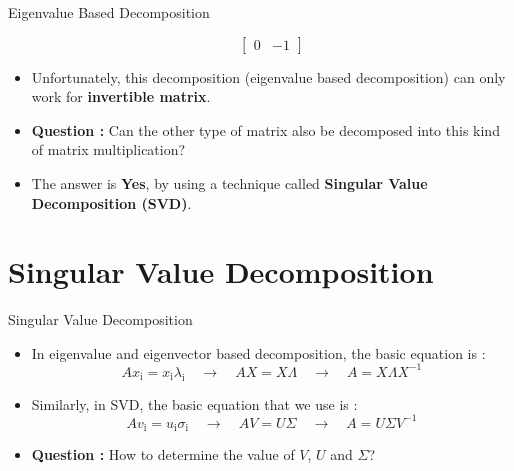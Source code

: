 \begin{frame}[t]{Eigenvalue Based Decomposition}
\begin{itemize}
\begin{equation*}
			\begin{bmatrix}
				0 & -1
			\end{bmatrix}
		\end{equation*}
		\item Unfortunately, this decomposition (eigenvalue based decomposition) can only work for \textbf{invertible matrix}.
		\item \textbf{Question :} Can the other type of matrix also be decomposed into this kind of matrix multiplication?
		\item The answer is \textbf{Yes}, by using a technique called \textbf{Singular Value Decomposition (SVD)}.
	\end{itemize}
\end{frame}

\section{Singular Value Decomposition}

\begin{frame}[t]{Singular Value Decomposition}
	\begin{itemize}
		\item In eigenvalue and eigenvector based decomposition, the basic equation is :
		\begin{equation*}
            A x_{\text{i}}  = x_{\text{i}} \lambda_{\text{i}}
			\quad \rightarrow \quad
			A X = X \Lambda
			\quad \rightarrow \quad
			A = X \Lambda X^{-1}
		\end{equation*}
		\item Similarly, in SVD, the basic equation that we use is :
		\begin{equation*}
            A v_{\text{i}} = u_{\text{i}} \sigma_{\text{i}}
			\quad \rightarrow \quad
			A V = U \Sigma
			\quad \rightarrow \quad
			A = U \Sigma V^{-1}
		\end{equation*}
		\item \textbf{Question : } How to determine the value of $V$, $U$ and $\Sigma$?
	\end{itemize}
\end{frame}

